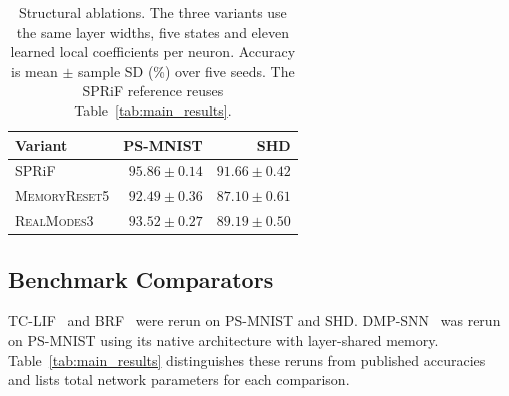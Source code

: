 \documentclass[letterpaper,journal]{IEEEtran}
\newcommand{\mr}{\textnormal{\textsc{MemoryReset5}}}
\newcommand{\rmodes}{\textnormal{\textsc{RealModes3}}}
\begin{document}
\begin{table}[t]
\caption{Structural ablations. The three variants use the same layer widths, five states and eleven learned local coefficients per neuron. Accuracy is mean $\pm$ sample SD (\%) over five seeds. The SPRiF reference reuses Table~\ref{tab:main_results}.}
\label{tab:ablation}
\centering\footnotesize
\begin{tabular}{@{}lrr@{}}
\toprule
Variant & PS-MNIST & SHD\\
\midrule
SPRiF & $95.86\pm0.14$ & $91.66\pm0.42$\\
\mr & $92.49\pm0.36$ & $87.10\pm0.61$\\
\rmodes & $93.52\pm0.27$ & $89.19\pm0.50$\\
\bottomrule
\end{tabular}
\end{table}

\subsection{Benchmark Comparators}
\label{sec:baselines}

TC-LIF~\cite{tclif} and BRF~\cite{brf} were rerun on PS-MNIST and SHD. DMP-SNN~\cite{sun2026dmp} was rerun on PS-MNIST using its native architecture with layer-shared memory. Table~\ref{tab:main_results} distinguishes these reruns from published accuracies and lists total network parameters for each comparison.
\end{document}
